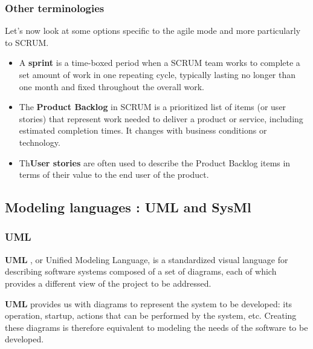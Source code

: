 \subsubsection{Other terminologies}
Let's now look at some options specific to the agile mode and more particularly to SCRUM.
\begin{itemize}
\item A \textbf{sprint} is a time-boxed period when a SCRUM team works to complete a set amount of work in one repeating cycle, typically lasting no longer than one month and fixed throughout the overall work.\cite{PGC10}
\item The \textbf{Product Backlog}   in SCRUM is a prioritized list of items (or user stories) that represent work needed to deliver a product or service, including estimated completion times. It changes with business conditions or technology.\cite{PGC10}
\item Th\textbf{User stories} are often used to describe the Product Backlog items in terms of their value to the end user of the product.\cite{PGC10}
\end{itemize}
\subsection{Modeling languages : UML and SysMl}
\subsubsection{UML}

\textbf{UML} , or Unified Modeling Language, is a standardized visual language for describing software systems composed of a set of diagrams, each of which provides a different view of the project to be addressed.\cite{HMB03}

\textbf{UML}  provides us with diagrams to represent the system to be developed: its operation, startup, actions that can be performed by the system, etc. Creating these diagrams is therefore equivalent to modeling the needs of the software to be developed.\cite{HMB03}

